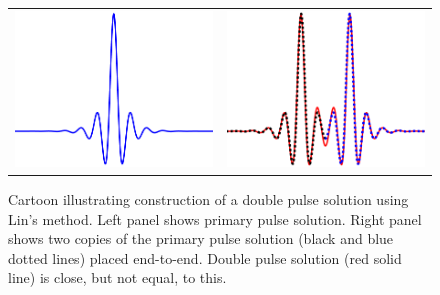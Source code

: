 \documentclass[12pt,reqno,oneside,hidelinks]{article}
\begin{document}
\begin{figure}
    \centering
    \begin{tabular}{cc}
        \includegraphics[width=6cm]{images/linchen1.png} &
        \includegraphics[width=6cm]{images/linchen2.png} 
    \end{tabular}
    \caption{Cartoon illustrating construction of a double pulse solution using Lin's method. Left panel shows primary pulse solution. Right panel shows two copies of the primary pulse solution (black and blue dotted lines) placed end-to-end. Double pulse solution (red solid line) is close, but not equal, to this.}
    \label{fig:linsmethod}
\end{figure}
\end{document}
